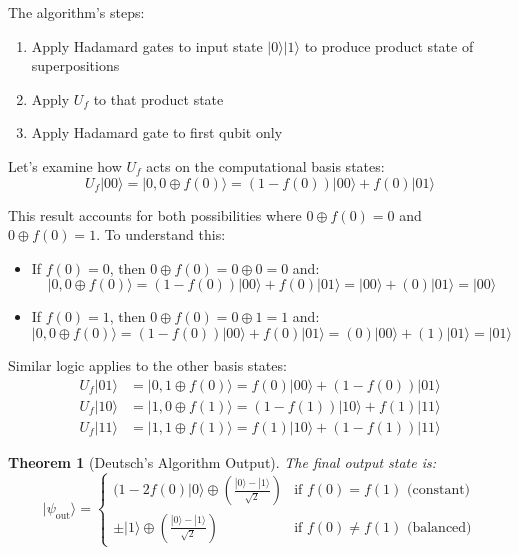 \documentclass{article}
\newtheorem{theorem}{Theorem}[subsection]
\begin{document}
The algorithm's steps:
\begin{enumerate}
    \item Apply Hadamard gates to input state $|0\rangle|1\rangle$ to produce product state of superpositions
    \item Apply $U_f$ to that product state
    \item Apply Hadamard gate to first qubit only
\end{enumerate}

\begin{conceptbox}
Let's examine how $U_f$ acts on the computational basis states:
\[
U_f|00\rangle = |0, 0 \oplus f(0)\rangle = (1-f(0))|00\rangle + f(0)|01\rangle
\]

This result accounts for both possibilities where $0 \oplus f(0) = 0$ and $0 \oplus f(0) = 1$. To understand this:
\begin{itemize}
    \item If $f(0) = 0$, then $0 \oplus f(0) = 0 \oplus 0 = 0$ and:
    \[
    |0, 0 \oplus f(0)\rangle = (1-f(0))|00\rangle + f(0)|01\rangle = |00\rangle + (0)|01\rangle = |00\rangle
    \]
    \item If $f(0) = 1$, then $0 \oplus f(0) = 0 \oplus 1 = 1$ and:
    \[
    |0, 0 \oplus f(0)\rangle = (1-f(0))|00\rangle + f(0)|01\rangle = (0)|00\rangle + (1)|01\rangle = |01\rangle
    \]
\end{itemize}

Similar logic applies to the other basis states:
\begin{align*}
U_f|01\rangle &= |0, 1 \oplus f(0)\rangle = f(0)|00\rangle + (1-f(0))|01\rangle \\
U_f|10\rangle &= |1, 0 \oplus f(1)\rangle = (1-f(1))|10\rangle + f(1)|11\rangle \\
U_f|11\rangle &= |1, 1 \oplus f(1)\rangle = f(1)|10\rangle + (1-f(1))|11\rangle
\end{align*}
\end{conceptbox}

\begin{theorem}[Deutsch's Algorithm Output]
The final output state is:
\[
|\psi_{\text{out}}\rangle = \begin{cases}
(1-2f(0)

|0\rangle\oplus\left(\frac{|0\rangle - |1\rangle}{\sqrt{2}}\right) & \text{if } f(0) = f(1) \text{ (constant)} \\
\pm|1\rangle\oplus\left(\frac{|0\rangle - |1\rangle}{\sqrt{2}}\right) & \text{if } f(0) \neq f(1) \text{ (balanced)}
\end{cases}
\]
\end{theorem}
\end{document}
